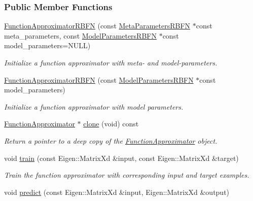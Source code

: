 \subsubsection*{Public Member Functions}
\begin{DoxyCompactItemize}
\item 
\hyperlink{classDmpBbo_1_1FunctionApproximatorRBFN_ade257a456c5cd62773d5b55b8ccd0090}{Function\+Approximator\+R\+B\+F\+N} (const \hyperlink{classDmpBbo_1_1MetaParametersRBFN}{Meta\+Parameters\+R\+B\+F\+N} $\ast$const meta\+\_\+parameters, const \hyperlink{classDmpBbo_1_1ModelParametersRBFN}{Model\+Parameters\+R\+B\+F\+N} $\ast$const model\+\_\+parameters=N\+U\+L\+L)
\begin{DoxyCompactList}\small\item\em Initialize a function approximator with meta-\/ and model-\/parameters. \end{DoxyCompactList}\item 
\hyperlink{classDmpBbo_1_1FunctionApproximatorRBFN_ac42696d1fbc10f2008fca4075482d860}{Function\+Approximator\+R\+B\+F\+N} (const \hyperlink{classDmpBbo_1_1ModelParametersRBFN}{Model\+Parameters\+R\+B\+F\+N} $\ast$const model\+\_\+parameters)
\begin{DoxyCompactList}\small\item\em Initialize a function approximator with model parameters. \end{DoxyCompactList}\item 
\hyperlink{classDmpBbo_1_1FunctionApproximator}{Function\+Approximator} $\ast$ \hyperlink{classDmpBbo_1_1FunctionApproximatorRBFN_ad792a46ac006916c5c1ffed2fa42dd24}{clone} (void) const 
\begin{DoxyCompactList}\small\item\em Return a pointer to a deep copy of the \hyperlink{classDmpBbo_1_1FunctionApproximator}{Function\+Approximator} object. \end{DoxyCompactList}\item 
void \hyperlink{classDmpBbo_1_1FunctionApproximatorRBFN_ac453415cf4894aba45e8db6ebc4cd4dc}{train} (const Eigen\+::\+Matrix\+Xd \&input, const Eigen\+::\+Matrix\+Xd \&target)
\begin{DoxyCompactList}\small\item\em Train the function approximator with corresponding input and target examples. \end{DoxyCompactList}\item 
void \hyperlink{classDmpBbo_1_1FunctionApproximatorRBFN_afe8dcfb9cd065dfde38dce1f6e6cd3e6}{predict} (const Eigen\+::\+Matrix\+Xd \&input, Eigen\+::\+Matrix\+Xd \&output)

\end{DoxyCompactItemize}
